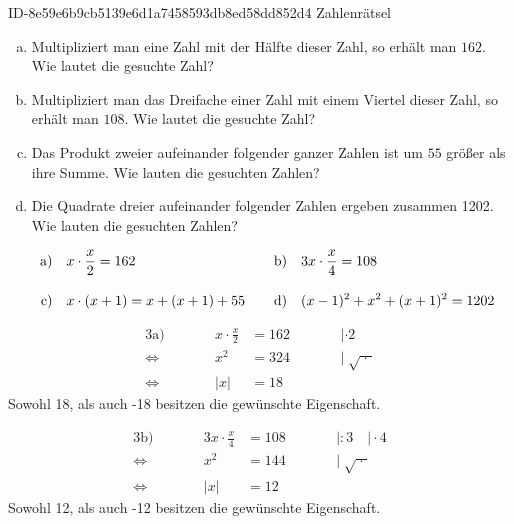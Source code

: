 \begin{exercise}
      {ID-8e59e6b9cb5139e6d1a7458593db8ed58dd852d4}
      {Zahlenrätsel}
  \ifproblem\problem\par
    \begin{enumerate}[a)]
      \item Multipliziert man eine Zahl mit der Hälfte dieser Zahl, so erhält man
            $162$. Wie lautet die gesuchte Zahl?
      \item Multipliziert man das Dreifache einer Zahl mit einem Viertel dieser
            Zahl, so erhält man $108$. Wie lautet die gesuchte Zahl?
      \item Das Produkt zweier aufeinander folgender ganzer Zahlen ist um $55$ größer
            als ihre Summe. Wie lauten die gesuchten Zahlen?
      \item Die Quadrate dreier aufeinander folgender Zahlen ergeben zusammen
            \num{1202}. Wie lauten die gesuchten Zahlen?
    \end{enumerate}
  \fi
  \ifoutline\outline\par
    \newcommand{\exnum}[1]{\text{\makebox[2em][r]{#1}}&\quad}
    \begin{align*}
      \exnum{a)}x\cdot\frac{x}{2}=162  & \exnum{b)}3x\cdot\frac{x}{4}=108 \\[2ex]
      \exnum{c)}x\cdot(x+1)=x+(x+1)+55 & \exnum{d)}(x-1)^2+x^2+(x+1)^2=1202
    \end{align*}
  \fi
  \ifoutcome\outcome\par
    \small
    \begin{alignat*}{3}
            \text{a)}&\qquad & x\cdot\frac{x}{2}&=162 & \qquad&|\cdot2             \\[2ex]
      \Leftrightarrow&\qquad &               x^2&=324 & \qquad&|\;\sqrt{\;\cdot\;} \\[2ex]
      \Leftrightarrow&\qquad &      \vert x\vert&=18  & \qquad&
    \end{alignat*}
    Sowohl 18, als auch -18 besitzen die gewünschte Eigenschaft.

    \begin{alignat*}{3}
            \text{b)}&\qquad &   3x\cdot\frac{x}{4}&=108   & \qquad&|:3\quad|\cdot4     \\[2ex]
      \Leftrightarrow&\qquad &                  x^2&=144   & \qquad&|\;\sqrt{\;\cdot\;} \\[2ex]
      \Leftrightarrow&\qquad &         \vert x\vert&=12    & \qquad&
    \end{alignat*}
    Sowohl 12, als auch -12 besitzen die gewünschte Eigenschaft.


\end{exercise}
